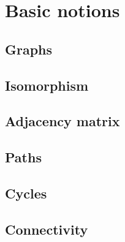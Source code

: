 \documentclass[main]{subfiles}
\begin{document}
\setcounter{section}{1}
\section{Basic notions}


\subsection{Graphs}

\subsection{Isomorphism}

\subsection{Adjacency matrix}

\subsection{Paths}

\subsection{Cycles}

\subsection{Connectivity}

\end{document}
